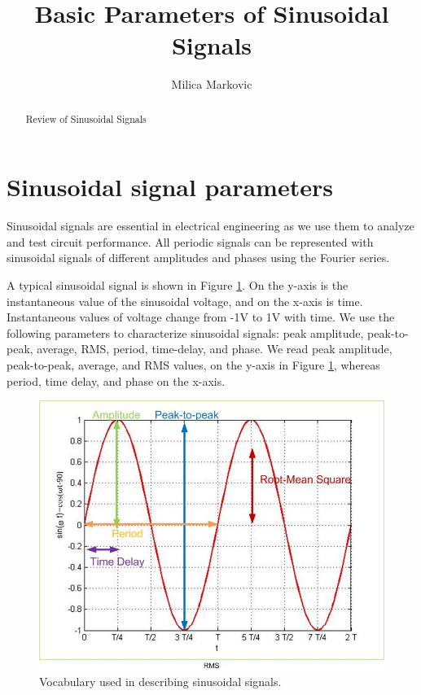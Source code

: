 \documentclass{ximera}
\title{Basic Parameters of Sinusoidal Signals}
\author{Milica Markovic}
\begin{document}
  
\begin{abstract}  
Review of Sinusoidal Signals
\end{abstract}  
\maketitle

\section{Sinusoidal signal parameters}

Sinusoidal signals are essential in electrical engineering as we use them to analyze and test circuit performance. All periodic signals can be represented with sinusoidal signals of different amplitudes and phases using the Fourier series. 

A typical sinusoidal signal is shown in Figure \ref{sinusoid}. On the y-axis is the instantaneous value of the sinusoidal voltage, and on the x-axis is time. Instantaneous values of voltage change from -1V to 1V with time. We use the following parameters to characterize sinusoidal signals: peak amplitude, peak-to-peak, average, RMS, period, time-delay, and phase. We read peak amplitude, peak-to-peak, average, and RMS values, on the y-axis in Figure \ref{sinusoid}, whereas period, time delay, and phase on the x-axis.

\begin{figure}[htbp]
\begin{center}
\includegraphics[scale=0.4]{jpg/sinusoid.jpg}
\caption{Vocabulary used in describing sinusoidal signals.}
\label{sinusoid}
\end{center}
\end{figure} 
\end{document}
